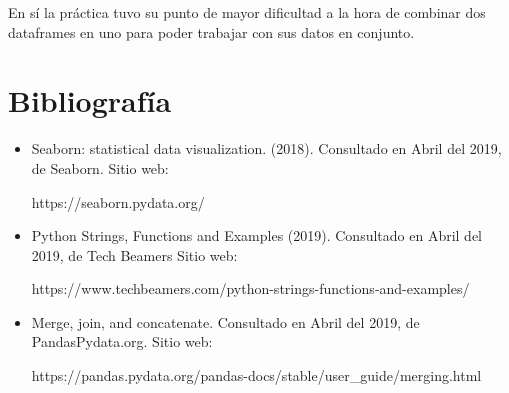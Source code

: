 \documentclass{article}
\begin{document}
En sí la práctica tuvo su punto de mayor dificultad a la hora de combinar dos dataframes en uno para poder trabajar con sus datos en conjunto.

\section{Bibliografía}
\begin{itemize}
    \item Seaborn: statistical data visualization. (2018). Consultado en Abril del 2019, de Seaborn. Sitio web: 
    
    https://seaborn.pydata.org/
    
    \item Python Strings, Functions and Examples (2019). Consultado en Abril del 2019, de Tech Beamers Sitio web:
    
    https://www.techbeamers.com/python-strings-functions-and-examples/
    
    \item Merge, join, and concatenate. Consultado en Abril del 2019, de PandasPydata.org. Sitio web:
    
    https://pandas.pydata.org/pandas-docs/stable/user\_guide/merging.html
    
\end{itemize}
\end{document}

